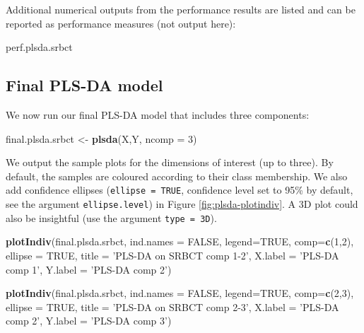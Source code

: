 \documentclass[]{book}
\newenvironment{Shaded}{\begin{snugshade}}{\end{snugshade}}
\newcommand{\DataTypeTok}[1]{\textcolor[rgb]{0.13,0.29,0.53}{#1}}
\newcommand{\DecValTok}[1]{\textcolor[rgb]{0.00,0.00,0.81}{#1}}
\newcommand{\KeywordTok}[1]{\textcolor[rgb]{0.13,0.29,0.53}{\textbf{#1}}}
\newcommand{\NormalTok}[1]{#1}
\newcommand{\OtherTok}[1]{\textcolor[rgb]{0.56,0.35,0.01}{#1}}
\newcommand{\StringTok}[1]{\textcolor[rgb]{0.31,0.60,0.02}{#1}}
\begin{document}
Additional numerical outputs from the performance results are listed and can be reported as performance measures (not output here):

\begin{Shaded}
\begin{Highlighting}[]
\NormalTok{perf.plsda.srbct}
\end{Highlighting}
\end{Shaded}

\hypertarget{PLSDA:final:perf}{%
\subsection{Final PLS-DA model}\label{PLSDA:final:perf}}

We now run our final PLS-DA model that includes three components:

\begin{Shaded}
\begin{Highlighting}[]
\NormalTok{final.plsda.srbct <-}\StringTok{ }\KeywordTok{plsda}\NormalTok{(X,Y, }\DataTypeTok{ncomp =} \DecValTok{3}\NormalTok{)}
\end{Highlighting}
\end{Shaded}

We output the sample plots for the dimensions of interest (up to three). By default, the samples are coloured according to their class membership. We also add confidence ellipses (\texttt{ellipse\ =\ TRUE}, confidence level set to 95\% by default, see the argument \texttt{ellipse.level}) in Figure \ref{fig:plsda-plotindiv}. A 3D plot could also be insightful (use the argument \texttt{type\ =\ \textquotesingle{}3D\textquotesingle{}}).

\begin{Shaded}
\begin{Highlighting}[]
\KeywordTok{plotIndiv}\NormalTok{(final.plsda.srbct, }\DataTypeTok{ind.names =} \OtherTok{FALSE}\NormalTok{, }\DataTypeTok{legend=}\OtherTok{TRUE}\NormalTok{,}
          \DataTypeTok{comp=}\KeywordTok{c}\NormalTok{(}\DecValTok{1}\NormalTok{,}\DecValTok{2}\NormalTok{), }\DataTypeTok{ellipse =} \OtherTok{TRUE}\NormalTok{, }
          \DataTypeTok{title =} \StringTok{'PLS-DA on SRBCT comp 1-2'}\NormalTok{,}
          \DataTypeTok{X.label =} \StringTok{'PLS-DA comp 1'}\NormalTok{, }\DataTypeTok{Y.label =} \StringTok{'PLS-DA comp 2'}\NormalTok{)}
\end{Highlighting}
\end{Shaded}

\begin{Shaded}
\begin{Highlighting}[]
\KeywordTok{plotIndiv}\NormalTok{(final.plsda.srbct, }\DataTypeTok{ind.names =} \OtherTok{FALSE}\NormalTok{, }\DataTypeTok{legend=}\OtherTok{TRUE}\NormalTok{,}
          \DataTypeTok{comp=}\KeywordTok{c}\NormalTok{(}\DecValTok{2}\NormalTok{,}\DecValTok{3}\NormalTok{), }\DataTypeTok{ellipse =} \OtherTok{TRUE}\NormalTok{, }
          \DataTypeTok{title =} \StringTok{'PLS-DA on SRBCT comp 2-3'}\NormalTok{,}
          \DataTypeTok{X.label =} \StringTok{'PLS-DA comp 2'}\NormalTok{, }\DataTypeTok{Y.label =} \StringTok{'PLS-DA comp 3'}\NormalTok{)}
\end{Highlighting}
\end{Shaded}
\end{document}
